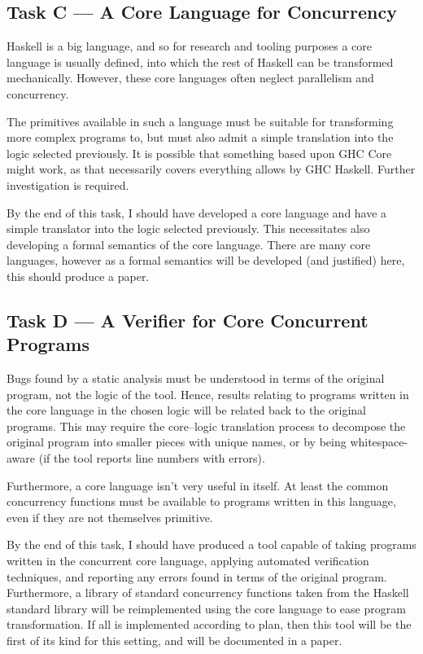 \subsection*{Task C --- A Core Language for Concurrency}
\label{sec:proposal-tasks-core}

Haskell is a big language, and so for research and tooling purposes a
core language is usually defined, into which the rest of Haskell can
be transformed mechanically. However, these core languages often
neglect parallelism and concurrency.

The primitives available in such a language must be suitable for
transforming more complex programs to, but must also admit a simple
translation into the logic selected previously. It is possible that
something based upon GHC Core might work, as that necessarily covers
everything allows by GHC Haskell. Further investigation is required.

By the end of this task, I should have developed a core language and
have a simple translator into the logic selected previously. This
necessitates also developing a formal semantics of the core
language. There are many core languages, however as a formal semantics
will be developed (and justified) here, this should produce a paper.

\subsection*{Task D --- A Verifier for Core Concurrent Programs}
\label{sec:proposal-tasks-verifier}

Bugs found by a static analysis must be understood in terms of the
original program, not the logic of the tool. Hence, results relating
to programs written in the core language in the chosen logic will be
related back to the original programs. This may require the
core--logic translation process to decompose the original program into
smaller pieces with unique names, or by being whitespace-aware (if the
tool reports line numbers with errors).

Furthermore, a core language isn't very useful in itself. At least the
common concurrency functions must be available to programs written in
this language, even if they are not themselves primitive.

By the end of this task, I should have produced a tool capable of
taking programs written in the concurrent core language, applying
automated verification techniques, and reporting any errors found in
terms of the original program. Furthermore, a library of standard
concurrency functions taken from the Haskell standard library will be
reimplemented using the core language to ease program
transformation. If all is implemented according to plan, then this
tool will be the first of its kind for this setting, and will be
documented in a paper.

